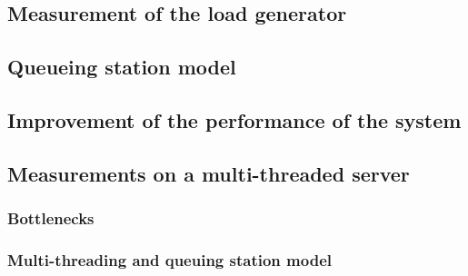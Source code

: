 \subsection{Measurement of the load generator}
\label{sub:Measurement of the load generator}

\subsection{Queueing station model}
\label{sub:Queueing station model}

\subsection{Improvement of the performance of the system}
\label{sub:Improvement of the performance of the system}

\subsection{Measurements on a multi-threaded server}
\label{sub:Measurements on a multi-threaded server}

\subsubsection{Bottlenecks}
\label{subs:Bottlenecks}


\subsubsection{Multi-threading and queuing station model}
\label{subs:Multi-threading and queuing station model}
